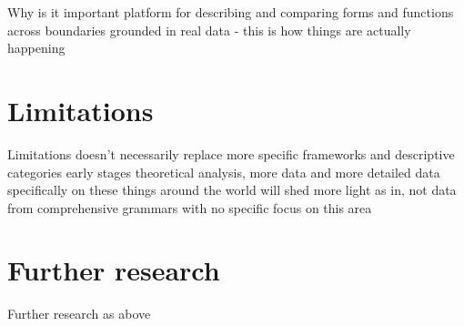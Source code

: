 Why is it important 
platform for describing and comparing forms and functions across boundaries
grounded in real data - this is how things are actually happening

\section{Limitations}
Limitations
doesn't necessarily replace more specific frameworks and descriptive categories
early stages theoretical analysis, more data and more detailed data specifically on these things around the world will shed more light
    as in, not data from comprehensive grammars with no specific focus on this area

\section{Further research}
Further research
as above